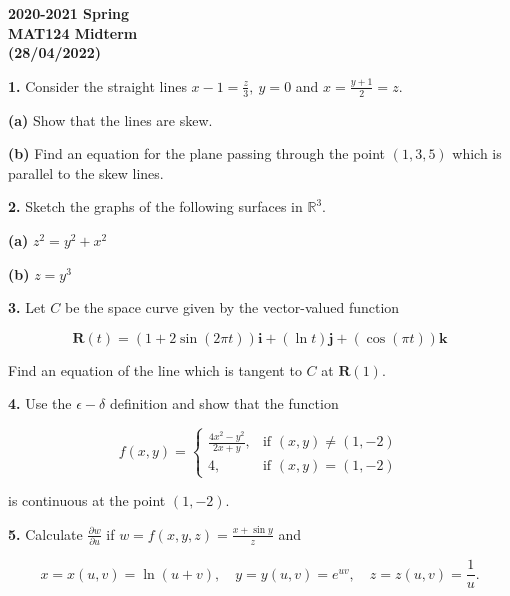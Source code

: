 \documentclass{article}
\begin{document}
\pagestyle{empty}
\large

\begin{center}
\textbf{2020-2021 Spring \\MAT124 Midterm\\(28/04/2022)}
\end{center}

\textbf{1.} Consider the straight lines $\displaystyle x-1=\frac z3,\: y=0$ and $\displaystyle x=\frac{y+1}2=z$.

\textbf{(a)} Show that the lines are skew.

\textbf{(b)} Find an equation for the plane passing through the point $(1,3,5)$ which is parallel to the skew lines.

\vspace{1em}

\textbf{2.} Sketch the graphs of the following surfaces in $\mathbb{R}^3$.

\textbf{(a)} $z^2=y^2+x^2$

\textbf{(b)} $z=y^3$

\vspace{1em}

\textbf{3.} Let $C$ be the space curve given by the vector-valued function

\[\mathbf{R}(t)=(1+2\sin(2\pi t))\mathbf{i}+(\ln t)\mathbf{j}+(\cos(\pi t))\mathbf{k}\]

Find an equation of the line which is tangent to $C$ at $\mathbf{R}(1)$.

\vspace{1em}

\textbf{4.} Use the $\epsilon-\delta$ definition and show that the function

\[f(x,y)=\left\{\begin{array}{cl}
\displaystyle\frac{4x^2-y^2}{2x+y},& \text{if }(x,y)\neq(1,-2)\\[1em]
4,&\text{if }(x,y)=(1,-2)
\end{array}\right.\]

is continuous at the point $(1,-2)$.

\vspace{1em}

\textbf{5.} Calculate $\displaystyle\frac{\partial w}{\partial u}$ if $\displaystyle w=f(x,y,z)=\frac{x+\sin y}z$ and

\[x=x(u,v)=\ln(u+v),\quad y=y(u,v)={e}^{uv},\quad z=z(u,v)=\frac1u.\]

\vspace{1em}
\end{document}
